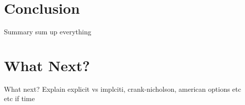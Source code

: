 \section{Conclusion}

\begin{frame}{Summary}
    sum up everything
\end{frame}


\section{What Next?}
\begin{frame}{What next?}
    Explain explicit vs implciti, crank-nicholson, american options etc etc if time
\end{frame}